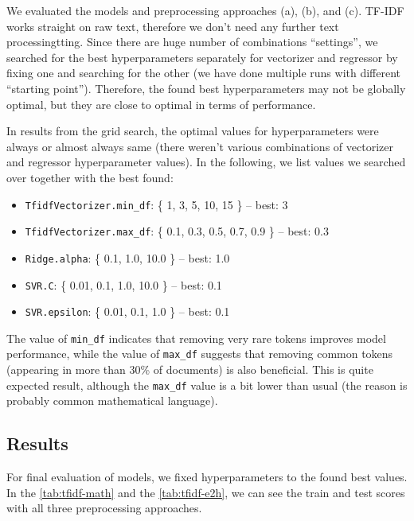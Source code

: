 \documentclass[runningheads]{llncs}
\begin{document}
We evaluated the models and preprocessing approaches (a), (b), and (c). TF-IDF works straight on raw text, therefore we don't need any further text processingtting. Since there are huge number of combinations ``settings'', we searched for the best hyperparameters separately for vectorizer and regressor by fixing one and searching for the other (we have done multiple runs with different ``starting point''). Therefore, the found best hyperparameters may not be globally optimal, but they are close to optimal in terms of performance.

In results from the grid search, the optimal values for hyperparameters were always or almost always same (there weren't various combinations of vectorizer and regressor hyperparameter values). In the following, we list values we searched over together with the best found:

\begin{itemize}
    \item \texttt{TfidfVectorizer.min\_df}: \{ 1, 3, 5, 10, 15 \} -- best: 3
    \item \texttt{TfidfVectorizer.max\_df}: \{ 0.1, 0.3, 0.5, 0.7, 0.9 \} -- best: 0.3
    \item \texttt{Ridge.alpha}: \{ 0.1, 1.0, 10.0 \} -- best: 1.0
    \item \texttt{SVR.C}: \{ 0.01, 0.1, 1.0, 10.0 \} -- best: 0.1
    \item \texttt{SVR.epsilon}: \{ 0.01, 0.1, 1.0 \} -- best: 0.1
\end{itemize}

The value of \texttt{min\_df} indicates that removing very rare tokens improves model performance, while the value of \texttt{max\_df} suggests that removing common tokens (appearing in more than 30\% of documents) is also beneficial. This is quite expected result, although the \texttt{max\_df} value is a bit lower than usual (the reason is probably common mathematical language).

\subsection{Results}

For final evaluation of models, we fixed hyperparameters to the found best values. In the \cref{tab:tfidf-math} and the \cref{tab:tfidf-e2h}, we can see the train and test scores with all three preprocessing approaches.

\vspace{5pt}
\end{document}
